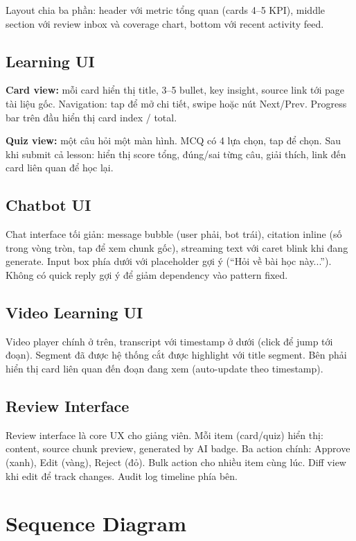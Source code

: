 Layout chia ba phần: header với metric tổng quan (cards 4--5 KPI), middle
section với review inbox và coverage chart, bottom với recent activity feed.

\subsection{Learning UI}

\textbf{Card view:} mỗi card hiển thị title, 3--5 bullet, key insight,
source link tới page tài liệu gốc. Navigation: tap để mở chi tiết, swipe
hoặc nút Next/Prev. Progress bar trên đầu hiển thị card index /
total.

\textbf{Quiz view:} một câu hỏi một màn hình. MCQ có 4 lựa chọn, tap để
chọn. Sau khi submit cả lesson: hiển thị score tổng, đúng/sai từng câu,
giải thích, link đến card liên quan để học lại.

\subsection{Chatbot UI}

Chat interface tối giản: message bubble (user phải, bot trái), citation
inline (số trong vòng tròn, tap để xem chunk gốc), streaming text với
caret blink khi đang generate. Input box phía dưới với placeholder gợi ý
(``Hỏi về bài học này...''). Không có quick reply gợi ý để giảm dependency
vào pattern fixed.

\subsection{Video Learning UI}

Video player chính ở trên, transcript với timestamp ở dưới (click để jump
tới đoạn). Segment đã được hệ thống cắt được highlight với title segment.
Bên phải hiển thị card liên quan đến đoạn đang xem (auto-update theo
timestamp).

\subsection{Review Interface}

Review interface là core UX cho giảng viên. Mỗi item (card/quiz) hiển thị:
content, source chunk preview, generated by AI badge. Ba action chính:
Approve (xanh), Edit (vàng), Reject (đỏ). Bulk action cho nhiều item cùng
lúc. Diff view khi edit để track changes. Audit log timeline phía bên.

\section{Sequence Diagram}

